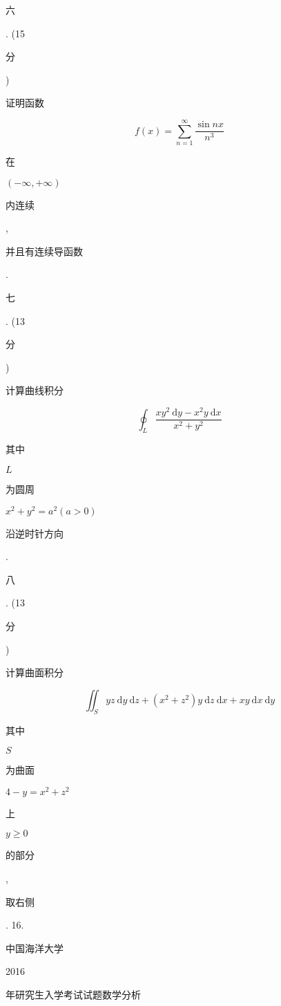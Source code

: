 \documentclass[10pt]{article}
\begin{document}
\begin{CJK}{UTF8}{mj}六\end{CJK}. (15 \begin{CJK}{UTF8}{mj}分\end{CJK}) \begin{CJK}{UTF8}{mj}证明函数\end{CJK}
$$
f(x)=\sum_{n=1}^{\infty} \frac{\sin n x}{n^{3}}
$$
\begin{CJK}{UTF8}{mj}在\end{CJK} $(-\infty,+\infty)$ \begin{CJK}{UTF8}{mj}内连续\end{CJK}, \begin{CJK}{UTF8}{mj}并且有连续导函数\end{CJK}. \begin{CJK}{UTF8}{mj}七\end{CJK}. (13 \begin{CJK}{UTF8}{mj}分\end{CJK}) \begin{CJK}{UTF8}{mj}计算曲线积分\end{CJK}
$$
\oint_{L} \frac{x y^{2} \mathrm{~d} y-x^{2} y \mathrm{~d} x}{x^{2}+y^{2}}
$$
\begin{CJK}{UTF8}{mj}其中\end{CJK} $L$ \begin{CJK}{UTF8}{mj}为圆周\end{CJK} $x^{2}+y^{2}=a^{2}(a>0)$ \begin{CJK}{UTF8}{mj}沿逆时针方向\end{CJK}.

\begin{CJK}{UTF8}{mj}八\end{CJK}. (13 \begin{CJK}{UTF8}{mj}分\end{CJK}) \begin{CJK}{UTF8}{mj}计算曲面积分\end{CJK}
$$
\iint_{S} y z \mathrm{~d} y \mathrm{~d} z+\left(x^{2}+z^{2}\right) y \mathrm{~d} z \mathrm{~d} x+x y \mathrm{~d} x \mathrm{~d} y
$$
\begin{CJK}{UTF8}{mj}其中\end{CJK} $S$ \begin{CJK}{UTF8}{mj}为曲面\end{CJK} $4-y=x^{2}+z^{2}$ \begin{CJK}{UTF8}{mj}上\end{CJK} $y \geqslant 0$ \begin{CJK}{UTF8}{mj}的部分\end{CJK}, \begin{CJK}{UTF8}{mj}取右侧\end{CJK}. 16. \begin{CJK}{UTF8}{mj}中国海洋大学\end{CJK} 2016 \begin{CJK}{UTF8}{mj}年研究生入学考试试题数学分析\end{CJK}
\end{document}
